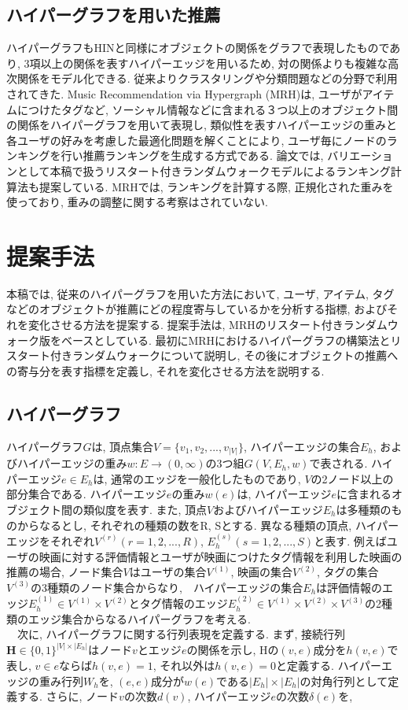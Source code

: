 \documentclass[a4j,11pt]{jarticle}           %
\begin{document}
	\subsection{ハイパーグラフを用いた推薦}
	ハイパーグラフもHINと同様にオブジェクトの関係をグラフで表現したものであり, 3項以上の関係を表すハイパーエッジを用いるため, 対の関係よりも複雑な高次関係をモデル化できる. 従来よりクラスタリングや分類問題などの分野で利用されてきた\cite{hyper}. Music Recommendation via Hypergraph (MRH)\cite{MRH}は, ユーザがアイテムにつけたタグなど, ソーシャル情報などに含まれる３つ以上のオブジェクト間の関係をハイパーグラフを用いて表現し, 類似性を表すハイパーエッジの重みと各ユーザの好みを考慮した最適化問題を解くことにより, ユーザ毎にノードのランキングを行い推薦ランキングを生成する方式である. 論文\cite{MRH}では, バリエーションとして本稿で扱うリスタート付きランダムウォークモデルによるランキング計算法も提案している. MRHでは, ランキングを計算する際, 正規化された重みを使っており, 重みの調整に関する考察はされていない. 
	\newpage
	\section{提案手法}
	本稿では, 従来のハイパーグラフを用いた方法において, ユーザ, アイテム, タグなどのオブジェクトが推薦にどの程度寄与しているかを分析する指標, およびそれを変化させる方法を提案する. 提案手法は, MRH\cite{MRH}のリスタート付きランダムウォーク版をベースとしている. 最初にMRHにおけるハイパーグラフの構築法とリスタート付きランダムウォークについて説明し, その後にオブジェクトの推薦への寄与分を表す指標を定義し, それを変化させる方法を説明する.
	\subsection{ハイパーグラフ}
	ハイパーグラフ$G$は, 頂点集合$V=\{v_1,v_2,...,v_{|V|}\}$, ハイパーエッジの集合$E_h$, およびハイパーエッジの重み$w:E\rightarrow (0,\infty)$の3つ組$G(V,E_h,w)$で表される. ハイパーエッジ$e\in{E_h}$は, 通常のエッジを一般化したものであり, $V$の2ノード以上の部分集合である. ハイパーエッジ$e$の重み$w(e)$は, ハイパーエッジ$e$に含まれるオブジェクト間の類似度を表す. また, 頂点$V$およびハイパーエッジ$E_h$は多種類のものからなるとし, それぞれの種類の数をR, Sとする. 異なる種類の頂点, ハイパーエッジをそれぞれ$V^{(r)}(r=1,2,...,R)$, $E_h^{(s)}(s=1,2,...,S)$と表す. 例えばユーザの映画に対する評価情報とユーザが映画につけたタグ情報を利用した映画の推薦の場合, ノード集合$V$はユーザの集合$V^{(1)}$, 映画の集合$V^{(2)}$, タグの集合$V^{(3)}$の3種類のノード集合からなり,　ハイパーエッジの集合$E_h$は評価情報のエッジ$E_h^{(1)}\in V^{(1)}\times V^{(2)}$とタグ情報のエッジ$E_h^{(2)}\in V^{(1)}\times V^{(2)}\times V^{(3)}$の2種類のエッジ集合からなるハイパーグラフを考える. 
	\\　次に,  ハイパーグラフに関する行列表現を定義する. まず, 接続行列$\textbf{H}\in \{0, 1\}^{|V|\times |E_h|}$はノード$v$とエッジ$e$の関係を示し, Hの$(v, e)$成分を$h(v, e)$で表し, $v\in{e}$ならば$h(v, e)=1$, それ以外は$h(v, e)=0$と定義する. ハイパーエッジの重み行列$W_h$を, $(e, e)$成分が$w(e)$である$|E_h|\times |E_h|$の対角行列として定義する. さらに, ノード$v$の次数$d(v)$, ハイパーエッジ$e$の次数$\delta(e)$を,
	
\end{document}
